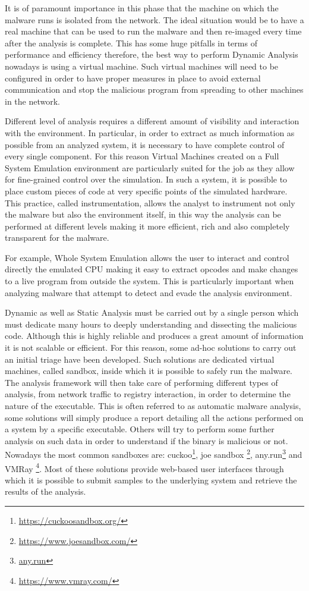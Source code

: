 It is of paramount importance in this phase that the machine on which the malware runs is isolated from the network. The ideal situation would be to have a real machine that can be used to run the malware and then re-imaged every time after the analysis is complete. This has some huge pitfalls in terms of performance and efficiency therefore, the best way to perform Dynamic Analysis nowadays is using a virtual machine. Such virtual machines will need to be configured in order to have proper measures in place to avoid external communication and stop the malicious program from spreading to other machines in the network. 

Different level of analysis requires a different amount of visibility and interaction with the environment. In particular, in order to extract as much information as possible from an analyzed system, it is necessary to have complete control of every single component. For this reason Virtual Machines created on a Full System Emulation environment are particularly suited for the job as they allow for fine-grained control over the simulation. In such a system, it is possible to place custom pieces of code at very specific points of the simulated hardware. This practice, called instrumentation, allows the analyst to instrument not only the malware but also the environment itself, in this way the analysis can be performed at different levels making it more efficient, rich and also completely transparent for the malware.

For example, Whole System Emulation allows the user to interact and control directly the emulated CPU making it easy to extract opcodes and make changes to a live program from outside the system. This is particularly important when analyzing malware that attempt to detect and evade the analysis environment. 

Dynamic as well as Static Analysis must be carried out by a single person which must dedicate many hours to deeply understanding and dissecting the malicious code. Although this is highly reliable and produces a great amount of information it is not scalable or efficient. For this reason, some ad-hoc solutions to carry out an initial triage have been developed. Such solutions are dedicated virtual machines, called sandbox, inside which it is possible to safely run the malware. The analysis framework will then take care of performing different types of analysis, from network traffic to registry interaction, in order to determine the nature of the executable. This is often referred to as automatic malware analysis, some solutions will simply produce a report detailing all the actions performed on a system by a specific executable. Others will try to perform some further analysis on such data in order to understand if the binary is malicious or not. Nowadays the most common sandboxes are: cuckoo\footnote{\url{https://cuckoosandbox.org/}}, joe sandbox \footnote{\url{https://www.joesandbox.com/}}, any.run\footnote{\url{any.run}} and VMRay \footnote{\url{https://www.vmray.com/}}. Most of these solutions provide web-based user interfaces through which it is possible to submit samples to the underlying system and retrieve the results of the analysis. 

